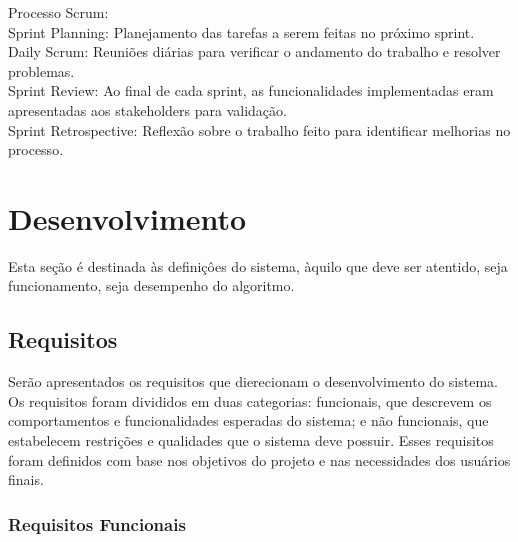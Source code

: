 \documentclass[
	article,			%
	12pt,				%
	oneside,			%
	a4paper,			%
	english,			%
	brazil,				%
	sumario=tradicional
	]{abntex2}
\begin{document}
Processo Scrum:\\
Sprint Planning: Planejamento das tarefas a serem feitas no próximo sprint.\\
Daily Scrum: Reuniões diárias para verificar o andamento do trabalho e resolver problemas.\\
Sprint Review: Ao final de cada sprint, as funcionalidades implementadas eram apresentadas aos stakeholders para validação.\\
Sprint Retrospective: Reflexão sobre o trabalho feito para identificar melhorias no processo.\\



\section{Desenvolvimento}

Esta seção é destinada às definiçôes do sistema, àquilo que deve ser atentido, seja funcionamento, seja desempenho do algoritmo. 

\subsection{Requisitos}
Serão apresentados os requisitos que dierecionam o desenvolvimento do sistema. Os requisitos foram divididos em duas categorias: funcionais, que descrevem os comportamentos e funcionalidades esperadas do sistema; e não funcionais, que estabelecem restrições e qualidades que o sistema deve possuir. Esses requisitos foram definidos com base nos objetivos do projeto e nas necessidades dos usuários finais.


\subsubsection{Requisitos Funcionais}
\end{document}
